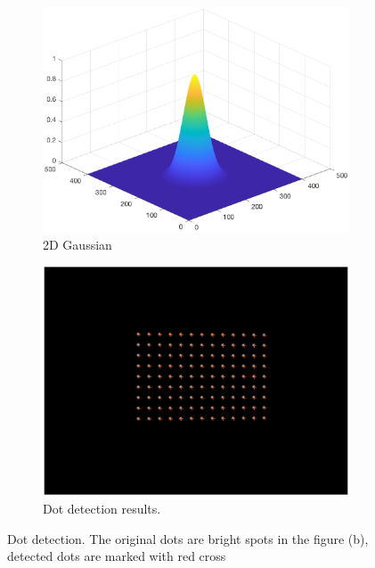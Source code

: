 \begin{figure}[h!]
	\centering
	\begin{subfigure}[t]{0.45\linewidth}
		\centering
		\includegraphics[width=1\linewidth]{figures/part2/gaussian_dis.eps}
		\caption{2D Gaussian}
		\label{fig:gaussian_dis}
	\end{subfigure}
	\begin{subfigure}[t]{0.45\linewidth}
		\centering
		\includegraphics[width=1\linewidth]{figures/part2/dot_detect.eps}
		\caption{Dot detection results.}
		\label{fig:dot_detect}
	\end{subfigure}
	\caption{Dot detection. The original dots are bright spots in the figure (b), detected dots are marked with red cross}
\end{figure}

